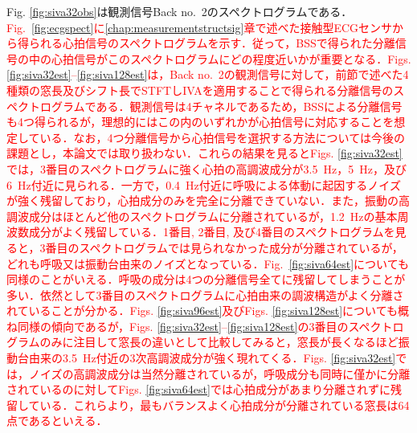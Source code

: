 Fig. \ref{fig:siva32obs}は観測信号Back no.~2のスペクトログラムである．\textcolor{red}{Fig.~\ref{fig:ecgspect}に\ref{chap:measurementstructsig}章で述べた接触型ECGセンサから得られる心拍信号のスペクトログラムを示す．従って，BSSで得られた分離信号の中の心拍信号がこのスペクトログラムにどの程度近いかが重要となる．Figs. \ref{fig:siva32est}--\ref{fig:siva128est}は，Back no.~2の観測信号に対して，前節で述べた4種類の窓長及びシフト長でSTFTしIVAを適用することで得られる分離信号のスペクトログラムである．観測信号は4チャネルであるため，BSSによる分離信号も4つ得られるが，理想的にはこの内のいずれかが心拍信号に対応することを想定している．なお，4つ分離信号から心拍信号を選択する方法については今後の課題とし，本論文では取り扱わない．これらの結果を見るとFigs. \ref{fig:siva32est}では，3番目のスペクトログラムに強く心拍の高調波成分が3.5~Hz，5~Hz，及び6~Hz付近に見られる．一方で，0.4~Hz付近に呼吸による体動に起因するノイズが強く残留しており，心拍成分のみを完全に分離できていない．また，振動の高調波成分はほとんど他のスペクトログラムに分離されているが，1.2~Hzの基本周波数成分がよく残留している．1番目, 2番目, 及び4番目のスペクトログラムを見ると，3番目のスペクトログラムでは見られなかった成分が分離されているが，どれも呼吸又は振動台由来のノイズとなっている．Fig.~\ref{fig:siva64est}についても同様のことがいえる．呼吸の成分は4つの分離信号全てに残留してしまうことが多い．依然として3番目のスペクトログラムに心拍由来の調波構造がよく分離されていることが分かる．Figs. \ref{fig:siva96est}及びFigs. \ref{fig:siva128est}についても概ね同様の傾向であるが，Figs. \ref{fig:siva32est}--\ref{fig:siva128est}の3番目のスペクトログラムのみに注目して窓長の違いとして比較してみると，窓長が長くなるほど振動台由来の3.5~Hz付近の3次高調波成分が強く現れてくる．Figs. \ref{fig:siva32est}では，ノイズの高調波成分は当然分離されているが，呼吸成分も同時に僅かに分離されているのに対してFigs. \ref{fig:siva64est}では心拍成分があまり分離されずに残留している．これらより，最もバランスよく心拍成分が分離されている窓長は64点であるといえる．}

